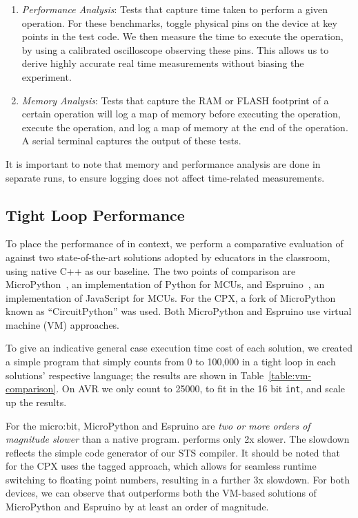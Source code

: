 \begin{enumerate}
    \item \textit{Performance Analysis}: Tests that capture time taken to perform a given operation. For these benchmarks, toggle physical pins on the device at key points in
    the test code. We then measure the time to
   execute the operation, by using a calibrated oscilloscope observing these pins. This allows us to derive highly accurate real time
   measurements without biasing the experiment.

    \item \textit{Memory Analysis}: Tests that capture the RAM or FLASH footprint of a certain operation will log a map of memory
    before executing the operation, execute the operation, and log a map of memory at the end of the operation.
    A serial terminal captures the output of these tests.
\end{enumerate}

It is important to note that memory and performance analysis are done in separate runs,
to ensure logging does not affect time-related measurements.

\subsection{Tight Loop Performance}

To place the performance of \MC in context, we perform a comparative evaluation of \MC against two state-of-the-art
solutions adopted by educators in the classroom, using native C++ as our baseline. The two points of comparison are MicroPython~\cite{MicroPython}, an implementation of Python for MCUs, and Espruino~\cite{espruinoBook}, an implementation of JavaScript for MCUs. For the CPX, a fork of MicroPython known as ``CircuitPython'' was used. Both MicroPython and Espruino use virtual machine (VM) approaches.

To give an indicative general case execution time cost of each solution, we created a simple program that simply
counts from 0 to 100,000 in a tight loop in each solutions' respective language; the results are shown in Table~\ref{table:vm-comparison}. On AVR we only count to 25000, to fit in the 16 bit \texttt{int}, and scale up the results.

For the micro:bit, MicroPython and Espruino are \emph{two or more orders of magnitude slower} than a native \CO program.
\MC performs only 2x slower. The slowdown reflects the simple code generator of our STS compiler. It should be noted that \MC for the CPX uses the tagged approach, which allows for seamless runtime switching to floating point numbers, resulting in a further 3x slowdown. For both devices, we can observe that \MC outperforms both the VM-based solutions of MicroPython and Espruino by at least an order of magnitude.

